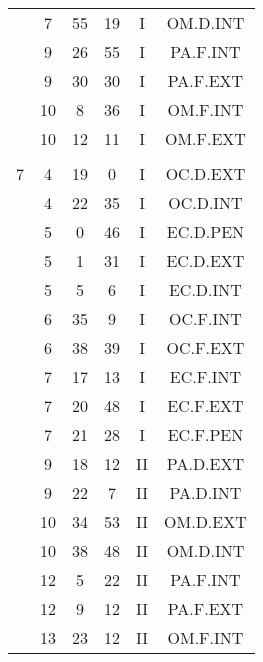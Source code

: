 \documentclass[12pt, a4paper]{article}
\begin{document}
\begin{multicols}{3}
{\begin{tabular}{c c c c c c}
	 	 	 	 & 7 & 55 & 19 & I & OM.D.INT\\%
	 	 	 	 & 9 & 26 & 55 & I & PA.F.INT\\%
	 	 	 	 & 9 & 30 & 30 & I & PA.F.EXT\\%
	 	 	 	 & 10 & 8 & 36 & I & OM.F.INT\\%
	 	 	 	 & 10 & 12 & 11 & I & OM.F.EXT\\%
	 	 	 	 & & & & & \\%
	 	 	 	7 & 4 & 19 & 0 & I & OC.D.EXT\\%
	 	 	 	 & 4 & 22 & 35 & I & OC.D.INT\\%
	 	 	 	 & 5 & 0 & 46 & I & EC.D.PEN\\%
	 	 	 	 & 5 & 1 & 31 & I & EC.D.EXT\\%
	 	 	 	 & 5 & 5 & 6 & I & EC.D.INT\\%
	 	 	 	 & 6 & 35 & 9 & I & OC.F.INT\\%
	 	 	 	 & 6 & 38 & 39 & I & OC.F.EXT\\%
	 	 	 	 & 7 & 17 & 13 & I & EC.F.INT\\%
	 	 	 	 & 7 & 20 & 48 & I & EC.F.EXT\\%
	 	 	 	 & 7 & 21 & 28 & I & EC.F.PEN\\%
	 	 	 	 & 9 & 18 & 12 & II & PA.D.EXT\\%
	 	 	 	 & 9 & 22 & 7 & II & PA.D.INT\\%
	 	 	 	 & 10 & 34 & 53 & II & OM.D.EXT\\%
	 	 	 	 & 10 & 38 & 48 & II & OM.D.INT\\%
	 	 	 	 & 12 & 5 & 22 & II & PA.F.INT\\%
	 	 	 	 & 12 & 9 & 12 & II & PA.F.EXT\\%
	 	 	 	 & 13 & 23 & 12 & II & OM.F.INT\\%

\end{tabular}}
\end{multicols}
\end{document}
